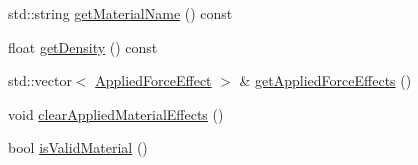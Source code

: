 \begin{DoxyCompactItemize}
std\+::string \mbox{\hyperlink{class_material_ac87a8b48812fc2ca84155a1179899635}{get\+Material\+Name}} () const
\item 
float \mbox{\hyperlink{class_material_ac414d481bc0f34f1a55e2d89d9584301}{get\+Density}} () const
\item 
std\+::vector$<$ \mbox{\hyperlink{struct_applied_force_effect}{Applied\+Force\+Effect}} $>$ \& \mbox{\hyperlink{class_material_ad443d451fe4f333fa2bd56f11937ebb0}{get\+Applied\+Force\+Effects}} ()
\item 
void \mbox{\hyperlink{class_material_a0f4cc73a9bb915e5739d14870b970b51}{clear\+Applied\+Material\+Effects}} ()
\item 
bool \mbox{\hyperlink{class_material_a5701802cfadd1ded2f934f15b3f018c9}{is\+Valid\+Material}} ()
\end{DoxyCompactItemize}
